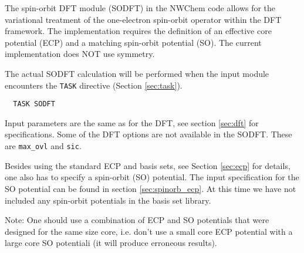 \label{sec:sodft}


The spin-orbit DFT module (SODFT) in the NWChem code allows for the variational treatment
of the one-electron spin-orbit operator within the DFT framework. The implementation 
requires the definition of an effective core potential (ECP) and a matching spin-orbit
potential (SO). The current implementation does NOT use symmetry. 

The actual SODFT calculation will be performed when the input module
encounters the \verb+TASK+ directive (Section \ref{sec:task}).  

\begin{verbatim}
  TASK SODFT
\end{verbatim}

Input parameters are the same as for the DFT, see section \ref{sec:dft} for specifications. 
Some of the DFT options are not available in the SODFT. These are \verb+max_ovl+ and 
\verb+sic+.

Besides using the standard ECP and basis sets, see Section \ref{sec:ecp} for details, one 
also has to specify a spin-orbit (SO) potential. The input specification for the SO potential
can be found in section \ref{sec:spinorb_ecp}. At this time we have not included any spin-orbit
potentials in the basis set library.

Note: One should use a combination of ECP and SO potentials that were designed for the same 
size core, i.e. don't use a small core ECP potential with a large core SO potentiali (it will
produce erroneous results).

